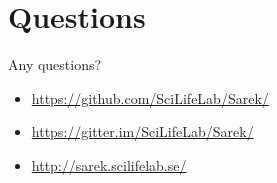\documentclass[usepdftitle=false]{beamer}
\begin{document}
{
	\section{Questions}
	\begin{frame}[plain]{Any questions?}
		\begin{itemize}
			\item[\faGithub] \url{https://github.com/SciLifeLab/Sarek/}
			\item[\faGitter] \url{https://gitter.im/SciLifeLab/Sarek/}
			\item[\faGlobe] \url{http://sarek.scilifelab.se/}
		\end{itemize}
		\vspace{6cm}
	\end{frame}
}
\end{document}
